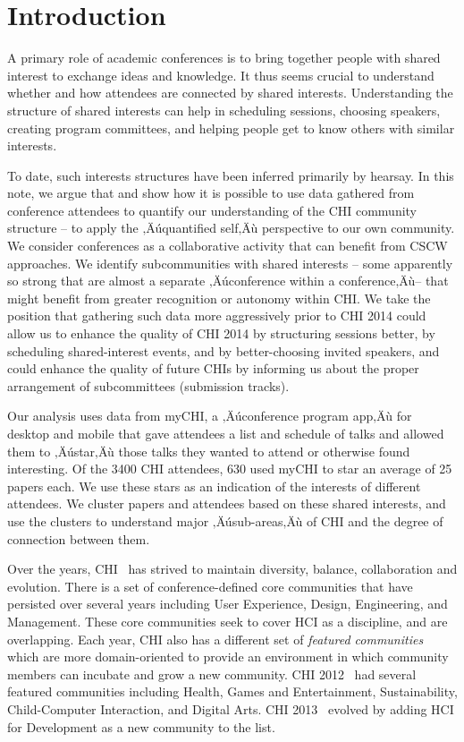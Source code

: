 \documentclass{sigchi}
\begin{document}

\section{Introduction}
A primary role of academic conferences is to bring together people with shared interest to exchange ideas and knowledge.  It thus seems crucial to understand whether and how attendees are connected by shared interests.  Understanding the structure of shared interests can help in scheduling sessions, choosing speakers, creating program committees, and helping people get to know others with similar interests.  

To date, such interests structures have been inferred primarily by hearsay.  In this note, we argue that and show how it is possible to use data gathered from conference attendees to quantify our understanding of the CHI community structure -- to apply the ‚Äúquantified self‚Äù perspective to our own community.  We consider conferences as a collaborative activity that can benefit from CSCW approaches.   We identify subcommunities with shared interests -- some apparently so strong that are almost a separate ‚Äúconference within a conference‚Äù-- that might benefit from greater recognition or autonomy within CHI.  We take the position that gathering such data more aggressively prior to CHI 2014 could allow us to enhance the quality of CHI 2014 by structuring sessions better, by scheduling shared-interest events, and by better-choosing invited speakers, and could enhance the quality of future CHIs by informing us about the proper arrangement of subcommittees (submission tracks).

Our analysis uses data from myCHI, a ‚Äúconference program app‚Äù for desktop and mobile that gave attendees a list and schedule of talks and allowed them to ‚Äústar‚Äù those talks they wanted to attend or otherwise found interesting.  Of the 3400 CHI attendees, 630 used myCHI to star an average of 25 papers each.  We use these stars as an indication of the interests of different attendees.  We cluster papers and attendees based on these shared interests, and use the clusters to understand major ‚Äúsub-areas‚Äù of CHI and the degree of connection between them.

Over the years, CHI~\cite{chi2013} has strived to maintain diversity, balance, collaboration and evolution. There is a set of conference-defined core communities that have persisted over several years including User Experience, Design, Engineering, and Management. These core communities seek to cover HCI as a discipline, and are overlapping. Each year, CHI also has a different set of \emph{featured communities} which are more domain-oriented to provide an environment in which community members can incubate and grow a new community.  CHI 2012~\cite{chi2012} had several featured communities including Health, Games and Entertainment, Sustainability, Child-Computer Interaction, and Digital Arts. CHI 2013~\cite{chi2013} evolved by adding HCI for Development as a new community to the list.
\end{document}

